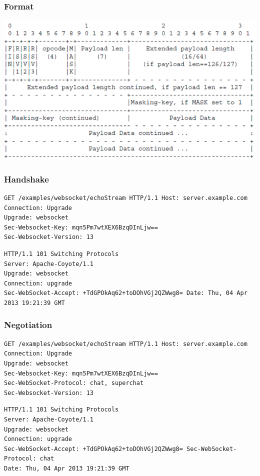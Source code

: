 \documentclass[10pt]{article}
\begin{document}
\subsubsection{Format}
\begin{center}
	\includegraphics[scale=0.3]{images/websocket-spec-format.png}
\end{center}
\subsubsection{Handshake}
\begin{lstlisting}
GET /examples/websocket/echoStream HTTP/1.1 Host: server.example.com
Connection: Upgrade
Upgrade: websocket
Sec-Websocket-Key: mqn5Pm7wtXEX6BzqDInLjw==
Sec-Websocket-Version: 13
\end{lstlisting}
\begin{lstlisting}
HTTP/1.1 101 Switching Protocols
Server: Apache-Coyote/1.1
Upgrade: websocket
Connection: upgrade
Sec-WebSocket-Accept: +TdGPOkAq62+toDOhVGj2QZWwg8= Date: Thu, 04 Apr 2013 19:21:39 GMT
\end{lstlisting}
\subsubsection{Negotiation}
\begin{lstlisting}
GET /examples/websocket/echoStream HTTP/1.1 Host: server.example.com
Connection: Upgrade
Upgrade: websocket
Sec-Websocket-Key: mqn5Pm7wtXEX6BzqDInLjw==
Sec-WebSocket-Protocol: chat, superchat
Sec-Websocket-Version: 13
\end{lstlisting}
\begin{lstlisting}
HTTP/1.1 101 Switching Protocols
Server: Apache-Coyote/1.1
Upgrade: websocket
Connection: upgrade
Sec-WebSocket-Accept: +TdGPOkAq62+toDOhVGj2QZWwg8= Sec-WebSocket-Protocol: chat
Date: Thu, 04 Apr 2013 19:21:39 GMT
\end{lstlisting}
\end{document}

